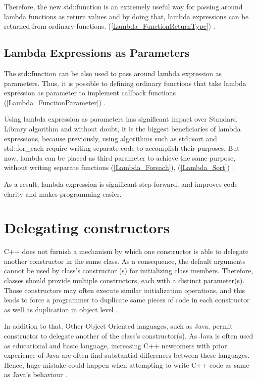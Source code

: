 \documentclass[11pt]{report}
\begin{document}
Therefore, the new std::function is an extremely useful way for passing around lambda functions as return values and by doing that, lambda expressions can be returned from ordinary functions. (\ref{Lambda_FunctionReturnType}) \cite {Josuttis:2012:CppStandard Library}.


\subsection{Lambda Expressions as Parameters}
\label{subsection: Lambda Expressions as Parameters}
The std::function can be also used to pass around lambda expression as parameters. Thus, it is possible to defining ordinary functions that take lambda expression as parameter to implement callback functions (\ref{Lambda_FunctionParameter}) \cite{Allain:2011:FutureCpp}.


Using lambda expression as parameters has significant impact over Standard Library algorithm and without doubt, it is the biggest beneficiaries of lambda expressions, because previously, using algorithms such as std::sort and std::for\_each require writing separate code to accomplish their purposes. But now, lambda can be placed as third parameter to achieve the same purpose, without writing separate functions (\ref{Lambda_Foreach}), (\ref{Lambda_Sort}) \cite {Gregorie:professionalcpp}.


As a result, lambda expression is significant step forward, and improves code clarity and makes programming easier.

\section{Delegating constructors}
\label{section: Delegating constructors}
C++ does not furnish a mechanism by which one constructor is able to delegate another constructor in the same class.  As a consequence, the default arguments cannot be used by class's constructor (s) for initializing class members. Therefore, classes should provide multiple constructors, each with a distinct parameter(s). Those constructors may often execute similar initialization operations, and this leads to force a programmer to duplicate same pieces of code in each constructor as well as duplication in object level \cite{Overland:2011:CWF}.


In addition to that, Other Object Oriented languages, such as Java, permit constructor to delegate another of the class's constructor(s). As Java is often used as educational and basic language, increasing C++ newcomers with prior experience of Java are often find substantial differences between these languages. Hence, huge mistake could happen when attempting to write C++ code as same as Java's behaviour \cite{Overland:2011:CWF}.
\end{document}
